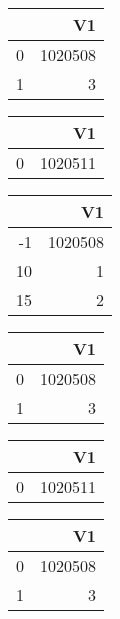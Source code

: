 \bigskip\bigskip
\centering
\begin{tabular}{rr}
  \hline
 & V1 \\ 
  \hline
0 & 1020508 \\ 
  1 &   3 \\ 
   \hline
\end{tabular}

\bigskip\bigskip
\centering
\begin{tabular}{rr}
  \hline
 & V1 \\ 
  \hline
0 & 1020511 \\ 
   \hline
\end{tabular}

\bigskip\bigskip
\centering
\begin{tabular}{rr}
  \hline
 & V1 \\ 
  \hline
-1 & 1020508 \\ 
  10 &   1 \\ 
  15 &   2 \\ 
   \hline
\end{tabular}

\bigskip\bigskip
\centering
\begin{tabular}{rr}
  \hline
 & V1 \\ 
  \hline
0 & 1020508 \\ 
  1 &   3 \\ 
   \hline
\end{tabular}

\bigskip\bigskip
\centering
\begin{tabular}{rr}
  \hline
 & V1 \\ 
  \hline
0 & 1020511 \\ 
   \hline
\end{tabular}

\bigskip\bigskip
\centering
\begin{tabular}{rr}
  \hline
 & V1 \\ 
  \hline
0 & 1020508 \\ 
  1 &   3 \\ 
   \hline
\end{tabular}


